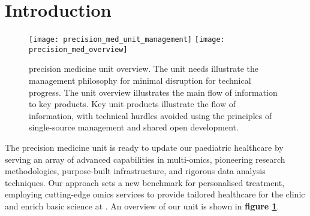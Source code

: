 \section{Introduction}
\label{intro}

\begin{figure}[h] \hspace*{0cm} 
\begin{center}
	\texttt{[image: precision\_med\_unit\_management]}
	\texttt{[image: precision\_med\_overview]}
	\caption{precision medicine unit overview. The unit needs illustrate the management philosophy for minimal disruption for technical progress. The unit overview illustrates the main flow of information to key products. Key unit products illustrate the flow of information, with technical hurdles avoided using the principles of single-source management and shared open development.}
	\label{fig:overview}
\end{center}
\end{figure}

The precision medicine unit is ready to update our paediatric healthcare by serving an array of advanced capabilities in multi-omics, pioneering research methodologies, purpose-built infrastructure, and rigorous data analysis techniques. 
Our approach sets a new benchmark for personalised treatment, employing cutting-edge omics services to provide tailored healthcare for the clinic and 
enrich basic science at \kispi. An overview of our unit is shown in 
\textbf{figure \ref{fig:overview}}.

